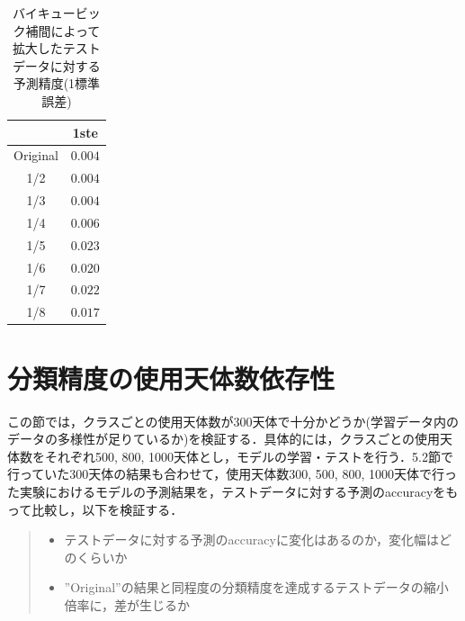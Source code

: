 \documentclass[a4j, 11pt]{jreport}
\begin{document}
\begin{table}[H]
  \centering
	\caption{バイキュービック補間によって拡大したテストデータに対する予測精度(1標準誤差)}
  \begin{tabular}{|c|c|}
		\hline
    & 1ste \\ \hline
    Original & $0.004$ \\ \hline
    1/2 & $0.004$ \\ \hline
    1/3 & $0.004$ \\ \hline
    1/4 & $0.006$ \\ \hline
    1/5 & $0.023$ \\ \hline
    1/6 & $0.020$ \\ \hline
    1/7 & $0.022$ \\ \hline
    1/8 & $0.017$ \\ \hline
  \end{tabular}
  \label{tb:accs_4_2_cubic_1ste}
\end{table}



\newpage
\section{分類精度の使用天体数依存性}
この節では，クラスごとの使用天体数が300天体で十分かどうか(学習データ内のデータの多様性が足りているか)を検証する．具体的には，クラスごとの使用天体数をそれぞれ500, 800, 1000天体とし，モデルの学習・テストを行う．5.2節で行っていた300天体の結果も合わせて，使用天体数300, 500, 800, 1000天体で行った実験におけるモデルの予測結果を，テストデータに対する予測のaccuracyをもって比較し，以下を検証する．
\begin{quote}
 \begin{itemize}
  \item テストデータに対する予測のaccuracyに変化はあるのか，変化幅はどのくらいか
  \item ''Original''の結果と同程度の分類精度を達成するテストデータの縮小倍率に，差が生じるか
 \end{itemize}
\end{quote}
\end{document}
